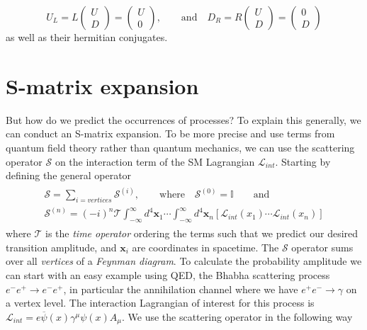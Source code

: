\documentclass[12pt, a4paper]{book}
\begin{document}
$$
U_L = L\begin{pmatrix}
    U\\D
\end{pmatrix} = \begin{pmatrix}
    U\\0
\end{pmatrix},\qquad\text{and}\quad D_R = R\begin{pmatrix}
    U\\D
\end{pmatrix} = \begin{pmatrix}
    0\\D
\end{pmatrix}
$$
as well as their hermitian conjugates. 


\section{S-matrix expansion}
But how do we predict the occurrences of processes? To explain this generally, we can conduct an S-matrix expansion. To be more precise and use terms from quantum field theory rather than quantum mechanics, we can use the scattering operator $\mathcal{S}$ on the interaction 
term of the SM Lagrangian $\mathcal{L}_{int}$. Starting by defining the general operator
\begin{align}\label{eq:S-matrix}
    \begin{split}
        \mathcal{S} = \sum_{i = vertices}\mathcal{S}^{(i)},\qquad\text{where}\quad \mathcal{S}^{(0)} = \mathbb{I}\qquad\text{and}\quad \\
        \mathcal{S}^{(n)}=(-i)^n\mathcal{T}\int_{-\infty}^{\infty}d^4\mathbf{x}_1\cdots\int_{-\infty}^{\infty}d^4\mathbf{x}_n\left[\mathcal{L}_{int}(x_1)\cdots\mathcal{L}_{int}(x_n)\right]
    \end{split}
\end{align}
where $\mathcal{T}$ is the \textit{time operator} ordering the terms such that we predict our desired transition amplitude, and $\mathbf{x}_i$ are coordinates in spacetime.  The $\mathcal{S}$ operator sums over all \textit{vertices} 
of a \textit{Feynman diagram}. To calculate the probability amplitude we can start with an easy example using QED, the Bhabha scattering process $e^- e^+\rightarrow e^-e^+$, in particular the annihilation channel where we have $e^+e^-\rightarrow\gamma$ on a vertex level. The interaction Lagrangian of interest for this process is
$\mathcal{L}_{int} = e\overline{\psi}(x)\gamma^\mu\psi(x)A_\mu$. We use the scattering operator in the following way
\end{document}
